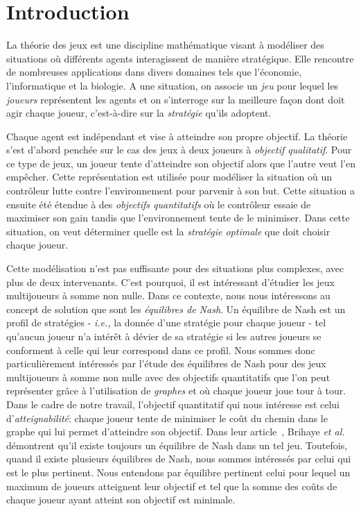 
\section{Introduction}

La théorie des jeux est une discipline mathématique visant à modéliser des situations où différents agents interagissent de manière stratégique. Elle rencontre de nombreuses applications dans divers domaines tels que l'économie, l'informatique et la biologie.
A une situation, on associe un \emph{jeu} pour lequel les \emph{joueurs} représentent les agents et on s'interroge sur la meilleure façon dont doit agir chaque joueur, c'est-à-dire sur la \emph{stratégie} qu'ils adoptent.

Chaque agent est indépendant et vise à atteindre son propre objectif. La théorie s'est d'abord penchée sur le cas des jeux à deux joueurs à \emph{objectif qualitatif}. Pour ce type de jeux, un joueur tente d'atteindre son objectif alors que l'autre veut l'en empêcher. Cette représentation est utilisée pour modéliser la situation où un contrôleur lutte contre l'environnement pour parvenir à son but. Cette situation a ensuite été étendue à des \emph{objectifs quantitatifs} où le contrôleur essaie de maximiser son gain tandis que l'environnement tente de le minimiser. Dans cette situation, on veut déterminer quelle est la \emph{stratégie optimale} que doit choisir chaque joueur.

Cette modélisation n'est pas suffisante pour des situations plus complexes, avec plus de deux intervenants. C'est pourquoi, il est intéressant d'étudier les jeux multijoueurs à somme non nulle. Dans ce contexte, nous nous intéressons au concept de solution que sont les \emph{équilibres de Nash}. Un équilibre de Nash est un profil de stratégies - \emph{i.e.,} la donnée d'une stratégie pour chaque joueur - tel qu'aucun joueur n'a intérêt à dévier de sa stratégie si les autres joueurs se conforment à celle qui leur correspond dans ce profil.
Nous sommes donc particulièrement intéressés par l'étude des équilibres de Nash pour des jeux multijoueurs à somme non nulle avec des objectifs quantitatifs que l'on peut représenter grâce à l'utilisation de \emph{graphes} et où chaque joueur joue tour à tour.\\


Dans le cadre de notre travail, l'objectif quantitatif qui nous intéresse est celui d'\emph{atteignabilité}: chaque joueur tente de minimiser le coût du chemin dans le graphe qui lui permet d'atteindre son objectif. Dans leur article~\cite{DBLP:conf/lfcs/BrihayePS13}, Brihaye \emph{et al.} démontrent qu'il existe toujours un équilibre de Nash dans un tel jeu. Toutefois, quand il existe plusieurs équilibres de Nash, nous sommes intéressés par celui qui est le plus pertinent. Nous entendons par équilibre pertinent  celui pour lequel un maximum de joueurs atteignent leur objectif et tel que la somme des coûts de chaque joueur ayant atteint son objectif est minimale.

